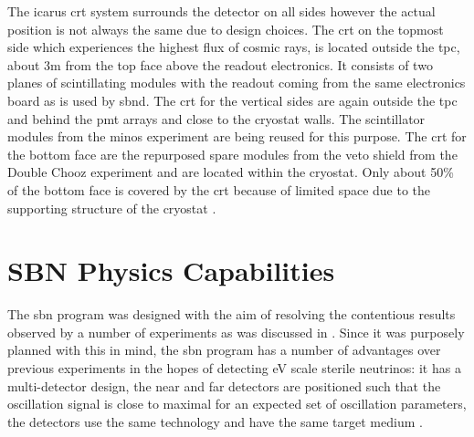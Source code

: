 The \gls{icarus} \gls{crt} system surrounds the detector on all sides however the actual position is not always the same due to design choices. The \gls{crt} on the topmost side which experiences the highest flux of cosmic rays, is located outside the \gls{tpc}, about 3m from the top face above the readout electronics. It consists of two planes of scintillating modules with the readout coming from the same electronics board as is used by \gls{sbnd}.
The \gls{crt} for the vertical sides are again outside the \gls{tpc} and behind the \gls{pmt} arrays and close to the cryostat walls. The scintillator modules from the \gls{minos} experiment are being reused for this purpose. The \gls{crt} for the bottom face are the repurposed spare modules from the veto shield from the Double Chooz experiment and are located within the cryostat. Only about 50\% of the bottom face is covered by the \gls{crt} because of limited space due to the supporting structure of the cryostat \cite{SBN_Proposal}\cite{ICARUS_CRT}.


\section{SBN Physics Capabilities}\label{sec:sbn_physics_capabilities}

The \gls{sbn} program was designed with the aim of resolving the contentious results observed by a number of experiments as was discussed in . Since it was purposely planned with this in mind, the \gls{sbn} program has a number of advantages over previous experiments in the hopes of detecting eV scale sterile neutrinos: it has a multi-detector design, the near and far detectors are positioned such that the oscillation signal is close to maximal for an expected set of oscillation parameters, the detectors use the same technology and have the same target medium \cite{SBN_paper}. 

